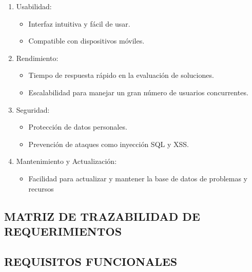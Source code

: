 \begin{enumerate}
    \item Usabilidad:
    \begin{itemize}
        \item Interfaz intuitiva y fácil de usar.
	\item Compatible con dispositivos móviles.
    \end{itemize}
    \item Rendimiento:
    \begin{itemize}
        \item Tiempo de respuesta rápido en la evaluación de soluciones.
	\item Escalabilidad para manejar un gran número de usuarios concurrentes.
    \end{itemize}
    \item Seguridad:
    \begin{itemize}
        \item Protección de datos personales.
	\item Prevención de ataques como inyección SQL y XSS.
    \end{itemize}
    \item Mantenimiento y Actualización:
    \begin{itemize}
        \item Facilidad para actualizar y mantener la base de datos de problemas y recursos
    \end{itemize}
\end{enumerate}

\subsection{MATRIZ DE TRAZABILIDAD DE REQUERIMIENTOS}

\subsection{REQUISITOS FUNCIONALES}

